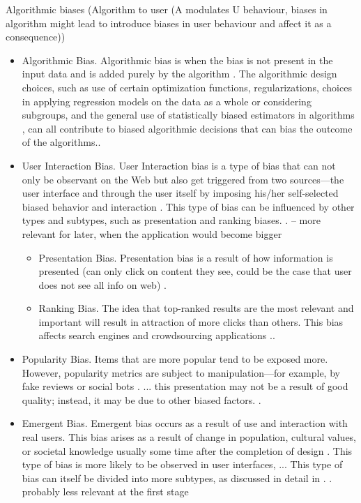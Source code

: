 \documentclass[12pt, a4paper, oneside]{book}   	%
\begin{document}
			Algorithmic biases (Algorithm to user (A modulates U behaviour, biases in algorithm might lead to introduce biases in user behaviour and affect it as a consequence)) \autocite{Mehrabi_2021}
			\begin{itemize}
				\item Algorithmic Bias. Algorithmic bias is when the bias is not present in the input data and is added purely by the algorithm \autocite{M9_Baeza-Yates_2018}. The algorithmic design choices, such as use of certain optimization functions, regularizations, choices in applying regression models on the data as a whole or considering subgroups, and the general use of statistically biased estimators in algorithms \autocite{M44_Danks_2017}, can all contribute to biased algorithmic decisions that can bias the outcome of the algorithms.\autocite{Mehrabi_2021}.
				\item User Interaction Bias. User Interaction bias is a type of bias that can not only be observant on the Web but also get triggered from two sources—the user interface and through the user itself by imposing his/her self-selected biased behavior and interaction \autocite{M9_Baeza-Yates_2018}. This type of bias can be influenced by other types and subtypes, such as presentation and ranking biases. \autocite{Mehrabi_2021}. -- more relevant for later, when the application would become bigger
				\begin{itemize}
					\item Presentation Bias. Presentation bias is a result of how information is presented \autocite{M9_Baeza-Yates_2018} (can only click on content they see, could be the case that user does not see all info on web) \autocite{Mehrabi_2021}.
					\item Ranking Bias. The idea that top-ranked results are the most relevant and important will result in attraction of more clicks than others. This bias affects search engines \autocite{M9_Baeza-Yates_2018} and crowdsourcing applications \autocite{M93_Lerman_2014}.\autocite{Mehrabi_2021}.
				\end{itemize}
				\item Popularity Bias. Items that are more popular tend to be exposed more. However, popularity metrics are subject to manipulation—for example, by fake reviews or social bots \autocite{M117_Ciampaglia_2018}. ... this presentation may not be a result of good quality; instead, it may be due to other biased factors. \autocite{Mehrabi_2021}.
				\item Emergent Bias. Emergent bias occurs as a result of use and interaction with real users. This bias arises as a result of change in population, cultural values, or societal knowledge usually some time after the completion of design \autocite{M53_Friedman_1996}. This type of bias is more likely to be observed in user interfaces, ... This type of bias can itself be divided into more subtypes, as discussed in detail in \autocite{M53_Friedman_1996}. \autocite{Mehrabi_2021}. probably less relevant at the first stage

\end{itemize}
\end{document}
